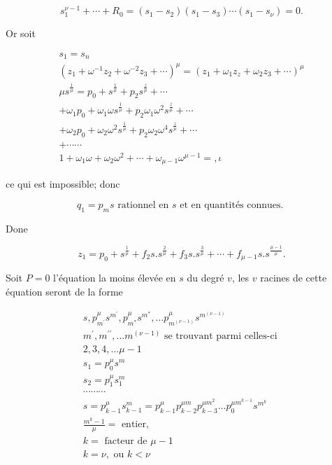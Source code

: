 \documentclass{article}
\begin{document}
\[
s_{1}^{\nu-1}+\cdots+R_{0}=\left(s_{1}-s_{2}\right)\left(s_{1}-s_{3}\right) \cdots\left(s_{1}-s_{\nu}\right)=0 .
\]

Or soit

\[
\begin{gathered}
s_{1}=s_{n} \\
\left(z_{1}+\omega^{-1} z_{2}+\omega^{-2} z_{3}+\cdots\right)^{\mu}=\left(z_{1}+\omega_{1} z_{z}+\omega_{2} z_{3}+\cdots\right)^{\mu} \\
\mu s^{\frac{1}{\mu}}=p_{0}+s^{\frac{1}{\mu}}+p_{2} s^{\frac{z}{\mu}}+\cdots \\
+\omega_{1} p_{0}+\omega_{1} \omega s^{\frac{1}{\mu}}+p_{2} \omega_{1} \omega^{2} s^{\frac{z}{\mu}}+\cdots \\
+\omega_{2} p_{0}+\omega_{2} \omega^{2} s^{\frac{1}{\mu}}+p_{2} \omega_{2} \omega^{4} s^{\frac{z}{\mu}}+\cdots \\
+\cdots \cdots \\
1+\omega_{1} \omega+\omega_{2} \omega^{2}+\cdots+\omega_{\mu-1} \omega^{\mu-1}=, \iota
\end{gathered}
\]

ce qui est impossible; donc

\[
q_{1}=p_{m} s \text { rationnel en } s \text { et en quantités connues. }
\]

Done

\[
z_{1}=p_{0}+s^{\frac{1}{\mu}}+f_{2} s . s^{\frac{2}{\mu}}+f_{3} s . s^{\frac{3}{\mu}}+\cdots+f_{\mu-1} s . s^{\frac{\mu-1}{\mu}} .
\]

Soit \(P=0\) l'équation la moins élevée en \(s\) du degré \(v\), les \(v\) racines de cette équation seront de la forme

\[
\begin{gathered}
s, p_{m^{\prime}}^{\mu} s^{m^{\prime}}, p_{m^{*}}^{\mu} s^{m^{*}}, \ldots p_{m^{(\nu-1)}}^{\mu} s^{m^{(\nu-1)}} \\
m^{\prime}, m^{\prime \prime}, \ldots m^{(\nu-1)} \text { se trouvant parmi celles-ci } \\
2,3,4, \ldots \mu-1 \\
s_{1}=p_{0}^{\mu} s^{m} \\
s_{2}=p_{1}^{\mu} s_{1}^{m} \\
\cdots \cdots \cdots \\
s=p_{k-1}^{\mu} s_{k-1}^{m}=p_{k-1}^{\mu} p_{k-2}^{\mu m} p_{k-3}^{\mu m^{2}} \ldots p_{0}^{\mu m^{k-1}} s^{m^{k}} \\
\frac{m^{k}-1}{\mu}=\text { entier, } \\
k=\text { facteur de } \mu-1 \\
k=\nu, \text { ou } k<\nu
\end{gathered}
\]
\end{document}
